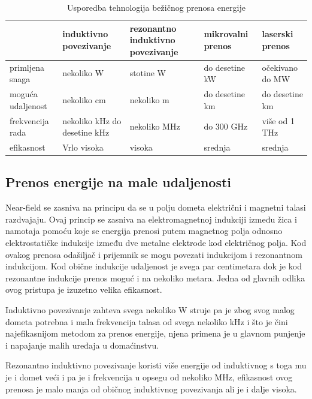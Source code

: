 \documentclass[a4paper]{article}
\begin{document}
\begin{table}[h]
    \centering
    \caption{Usporedba tehnologija bežičnog prenosa energije}
    
    \begin{tabular}{|p{2 cm}|p{2 cm}|p{2 cm}|p{2 cm}|p{2 cm}|}
        \hline
    & induktivno  povezivanje & rezonantno induktivno povezivanje & mikrovalni prenos & laserski prenos \\ \hline
    primljena snaga  & nekoliko W & stotine W & do desetine kW & očekivano do MW\\ \hline
    moguća udaljenost & nekoliko cm & nekoliko m & do desetine km & do desetine km \\ \hline
    frekvencija rada & nekoliko kHz do desetine kHz & nekoliko MHz & do 300 GHz & više od 1 THz \\ \hline
    efikasnost & Vrlo visoka & visoka & srednja & srednja \\ \hline
        
    
    \end{tabular}
    \end{table}
    
    


\subsection{Prenos energije na male udaljenosti}
\label{subsec:prenosenergijenamaleudaljenosti}


Near-field se zasniva na principu da se u polju dometa električni i magnetni talasi razdvajaju.
Ovaj princip se zasniva na elektromagnetnoj indukciji između žica i namotaja pomoću koje se energija prenosi putem magnetnog polja odnosno elektrostatičke indukcije između dve metalne elektrode kod električnog polja.
Kod ovakog prenosa odašiljač i prijemnik se mogu povezati indukcijom i rezonantnom indukcijom.
Kod obične indukcije udaljenost je svega par centimetara dok je kod rezonantne indukcije prenos moguć i na nekoliko metara. Jedna od glavnih odlika ovog pristupa je izuzetno velika efikasnost.

Induktivno povezivanje zahteva svega nekoliko W struje pa je zbog svog malog dometa potrebna i mala frekvencija talasa od svega nekoliko kHz i što je čini najefikasnijom metodom za prenos energije, njena primena je u glavnom punjenje i napajanje malih uređaja u domaćinstvu.

Rezonantno induktivno povezivanje koristi više energije od induktivnog s toga mu je i domet veći i pa je i frekvencija u opsegu od nekoliko MHz, efikasnost ovog prenosa je malo manja od običnog induktivnog povezivanja ali je i dalje visoka.
\end{document}

